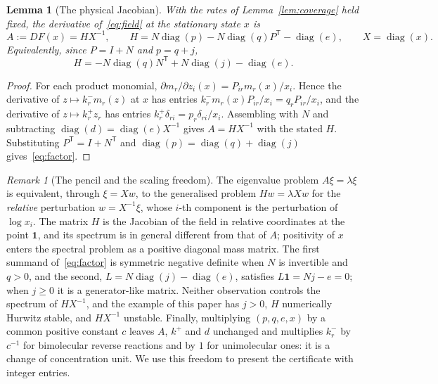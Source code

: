 \documentclass[11pt,a4paper]{article}
\theoremstyle{plain}
\newtheorem{lemma}[theorem]{Lemma}
\theoremstyle{definition}
\theoremstyle{remark}
\newtheorem{remark}[theorem]{Remark}
\numberwithin{equation}{section}
\newcommand{\one}{\mathbf{1}}
\newcommand{\diag}{\operatorname{diag}}
\begin{document}
\begin{lemma}[The physical Jacobian]\label{lem:jacobian}
With the rates of Lemma~\ref{lem:coverage} held fixed, the derivative of~\eqref{eq:field} at the stationary state $x$ is
\begin{equation}\label{eq:jacobian}
A:=DF(x)=HX^{-1},\qquad H=N\diag(p)-N\diag(q)P^{\mathsf T}-\diag(e),\qquad X=\diag(x).
\end{equation}
Equivalently, since $P=I+N$ and $p=q+j$,
\begin{equation}\label{eq:factor}
H=-N\diag(q)N^{\mathsf T}+N\diag(j)-\diag(e).
\end{equation}
\end{lemma}

\begin{proof}
For each product monomial, $\partial m_r/\partial z_i(x)=P_{ir}m_r(x)/x_i$. Hence the derivative of $z\mapsto k_r^-m_r(z)$ at $x$ has entries $k_r^-m_r(x)P_{ir}/x_i=q_rP_{ir}/x_i$, and the derivative of $z\mapsto k_r^+z_r$ has entries $k_r^+\delta_{ri}=p_r\delta_{ri}/x_i$. Assembling with $N$ and subtracting $\diag(d)=\diag(e)X^{-1}$ gives $A=HX^{-1}$ with the stated $H$. Substituting $P^{\mathsf T}=I+N^{\mathsf T}$ and $\diag(p)=\diag(q)+\diag(j)$ gives~\eqref{eq:factor}.
\end{proof}

\begin{remark}[The pencil and the scaling freedom]\label{rem:pencil}
The eigenvalue problem $A\xi=\lambda\xi$ is equivalent, through $\xi=Xw$, to the generalised problem $Hw=\lambda Xw$ for the \emph{relative} perturbation $w=X^{-1}\xi$, whose $i$-th component is the perturbation of $\log x_i$. The matrix $H$ is the Jacobian of the field in relative coordinates at the point $\one$, and its spectrum is in general different from that of $A$; positivity of $x$ enters the spectral problem as a positive diagonal mass matrix. The first summand of~\eqref{eq:factor} is symmetric negative definite when $N$ is invertible and $q>0$, and the second, $L=N\diag(j)-\diag(e)$, satisfies $L\one=Nj-e=0$; when $j\ge0$ it is a generator-like matrix. Neither observation controls the spectrum of $HX^{-1}$, and the example of this paper has $j>0$, $H$ numerically Hurwitz stable, and $HX^{-1}$ unstable. Finally, multiplying $(p,q,e,x)$ by a common positive constant $c$ leaves $A$, $k^+$ and $d$ unchanged and multiplies $k_r^-$ by $c^{-1}$ for bimolecular reverse reactions and by $1$ for unimolecular ones: it is a change of concentration unit. We use this freedom to present the certificate with integer entries.
\end{remark}
\end{document}
